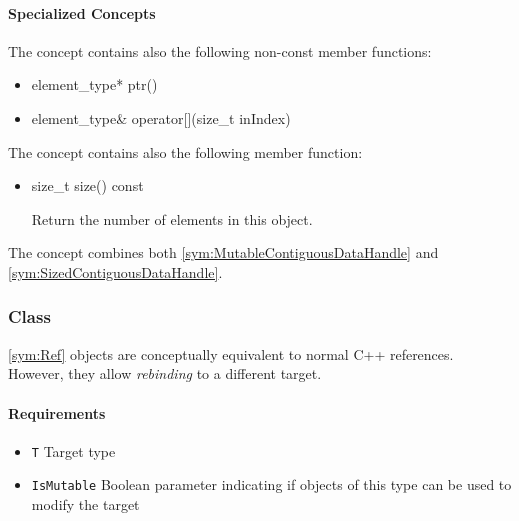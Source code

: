 \paragraph{Specialized Concepts}

The concept  contains also the following non-const member functions:
%
\begin{itemize}
	\item
		\begin{cppsnippet}
		element_type* ptr()
		\end{cppsnippet}

	\item
		\begin{cppsnippet}
		element_type& operator[](size_t inIndex)
		\end{cppsnippet}
\end{itemize}
%
The concept  contains also the following member function:
%
\begin{itemize}
	\item
		\begin{cppsnippet}
		size_t size() const
		\end{cppsnippet}
		
		Return the number of elements in this object.
\end{itemize}
%
The concept  combines both \ref{sym:MutableContiguousDataHandle} and \ref{sym:SizedContiguousDataHandle}.

\subsubsection[Class Ref]{Class }

\ref{sym:Ref} objects are conceptually equivalent to normal C++ references. However, they allow \emph{rebinding} to a different target.

\paragraph{Requirements}

\begin{itemize}
	\item \texttt{T} Target type
	\item \texttt{IsMutable} Boolean parameter indicating if objects of this type can be used to modify the target
\end{itemize}

